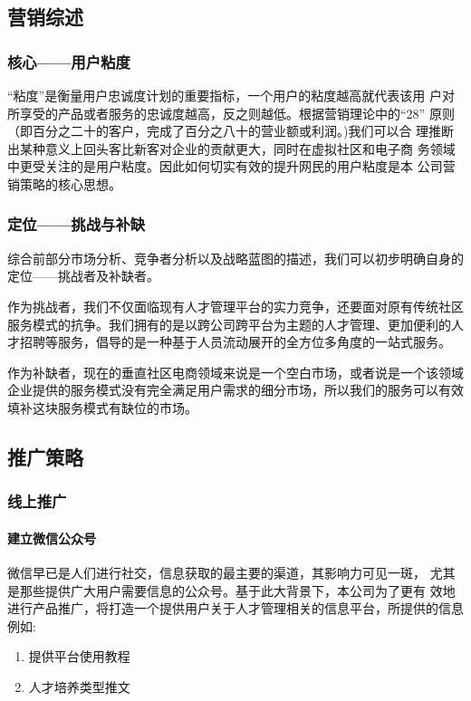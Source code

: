 \documentclass[UTF8]{ctexart}
\begin{document}
\subsection{营销综述}
\subsubsection{核心——用户粘度}
“粘度”是衡量用户忠诚度计划的重要指标，一个用户的粘度越高就代表该用 户对所享受的产品或者服务的忠诚度越高，反之则越低。根据营销理论中的“28” 原则（即百分之二十的客户，完成了百分之八十的营业额或利润。)我们可以合 理推断出某种意义上回头客比新客对企业的贡献更大，同时在虚拟社区和电子商 务领域中更受关注的是用户粘度。因此如何切实有效的提升网民的用户粘度是本 公司营销策略的核心思想。
\subsubsection{定位——挑战与补缺}
综合前部分市场分析、竞争者分析以及战略蓝图的描述，我们可以初步明确自身的定位——挑战者及补缺者。

作为挑战者，我们不仅面临现有人才管理平台的实力竞争，还要面对原有传统社区服务模式的抗争。我们拥有的是以跨公司跨平台为主题的人才管理、更加便利的人才招聘等服务，倡导的是一种基于人员流动展开的全方位多角度的一站式服务。

作为补缺者，现在的垂直社区电商领域来说是一个空白市场，或者说是一个该领域企业提供的服务模式没有完全满足用户需求的细分市场，所以我们的服务可以有效填补这块服务模式有缺位的市场。
\subsection{推广策略}
\subsubsection{线上推广}
\paragraph{建立微信公众号}


微信早已是人们进行社交，信息获取的最主要的渠道，其影响力可见一斑， 尤其是那些提供广大用户需要信息的公众号。基于此大背景下，本公司为了更有 效地进行产品推广，将打造一个提供用户关于人才管理相关的信息平台，所提供的信息例如:
\begin{enumerate}[1)]
	\item 提供平台使用教程
	\item 人才培养类型推文
\end{enumerate}
\end{document}
